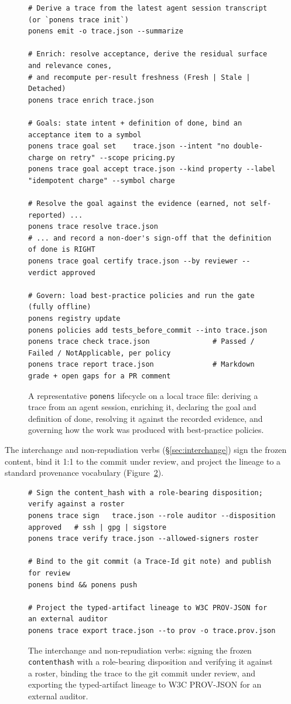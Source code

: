 \documentclass[11pt]{article}
\newcommand{\codeus}{\textunderscore\penalty100\relax}
\newcommand{\code}[1]{\texttt{\let\_\codeus #1}}
\begin{document}
\begin{figure}[H]
\begin{lstlisting}[language=PonensCLI]
# Derive a trace from the latest agent session transcript (or `ponens trace init`)
ponens emit -o trace.json --summarize

# Enrich: resolve acceptance, derive the residual surface and relevance cones,
# and recompute per-result freshness (Fresh | Stale | Detached)
ponens trace enrich trace.json

# Goals: state intent + definition of done, bind an acceptance item to a symbol
ponens trace goal set    trace.json --intent "no double-charge on retry" --scope pricing.py
ponens trace goal accept trace.json --kind property --label "idempotent charge" --symbol charge

# Resolve the goal against the evidence (earned, not self-reported) ...
ponens trace resolve trace.json
# ... and record a non-doer's sign-off that the definition of done is RIGHT
ponens trace goal certify trace.json --by reviewer --verdict approved

# Govern: load best-practice policies and run the gate (fully offline)
ponens registry update
ponens policies add tests_before_commit --into trace.json
ponens trace check trace.json               # Passed / Failed / NotApplicable, per policy
ponens trace report trace.json              # Markdown grade + open gaps for a PR comment
\end{lstlisting}
\caption{A representative \code{ponens} lifecycle on a local trace file: deriving a trace from an agent session, enriching it, declaring the goal and definition of done, resolving it against the recorded evidence, and governing how the work was produced with best-practice policies.}
\label{fig:core-cli-lifecycle}
\end{figure}

The interchange and non-repudiation verbs (\S\ref{sec:interchange}) sign the frozen content, bind it 1:1 to
the commit under review, and project the lineage to a standard provenance vocabulary (Figure~\ref{fig:core-cli-interchange}).

\begin{figure}[H]
\begin{lstlisting}[language=PonensCLI]
# Sign the content_hash with a role-bearing disposition; verify against a roster
ponens trace sign   trace.json --role auditor --disposition approved   # ssh | gpg | sigstore
ponens trace verify trace.json --allowed-signers roster

# Bind to the git commit (a Trace-Id git note) and publish for review
ponens bind && ponens push

# Project the typed-artifact lineage to W3C PROV-JSON for an external auditor
ponens trace export trace.json --to prov -o trace.prov.json
\end{lstlisting}
\caption{The interchange and non-repudiation verbs: signing the frozen \code{content\_hash} with a role-bearing disposition and verifying it against a roster, binding the trace to the git commit under review, and exporting the typed-artifact lineage to W3C PROV-JSON for an external auditor.}
\label{fig:core-cli-interchange}
\end{figure}
\end{document}
